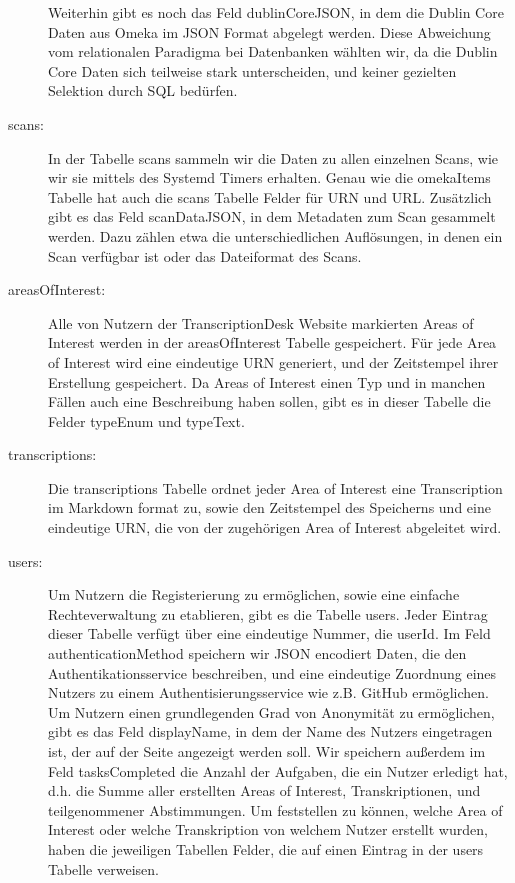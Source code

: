 \documentclass{article}
\begin{document}
\begin{description}
    Weiterhin gibt es noch das Feld dublinCoreJSON,
    in dem die Dublin Core Daten aus Omeka im JSON Format abgelegt werden.
    Diese Abweichung vom relationalen Paradigma bei Datenbanken wählten wir,
    da die Dublin Core Daten sich teilweise stark unterscheiden,
    und keiner gezielten Selektion durch SQL bedürfen.
\item[scans:]
    In der Tabelle scans sammeln wir die Daten zu allen einzelnen Scans,
    wie wir sie mittels des Systemd Timers erhalten.
    Genau wie die omekaItems Tabelle hat auch die scans Tabelle Felder für URN und URL.
    Zusätzlich gibt es das Feld scanDataJSON,
    in dem Metadaten zum Scan gesammelt werden.
    Dazu zählen etwa die unterschiedlichen Auflösungen,
    in denen ein Scan verfügbar ist
    oder das Dateiformat des Scans.
\item[areasOfInterest:]
    Alle von Nutzern der TranscriptionDesk Website markierten Areas of Interest werden in der areasOfInterest Tabelle gespeichert.
    Für jede Area of Interest wird eine eindeutige URN generiert,
    und der Zeitstempel ihrer Erstellung gespeichert.
    Da Areas of Interest einen Typ und in manchen Fällen auch eine Beschreibung haben sollen,
    gibt es in dieser Tabelle die Felder typeEnum und typeText.
\item[transcriptions:]
    Die transcriptions Tabelle ordnet jeder Area of Interest eine Transcription im Markdown format zu,
    sowie den Zeitstempel des Speicherns und eine eindeutige URN, die von der zugehörigen Area of Interest abgeleitet wird.
\item[users:]
    Um Nutzern die Registerierung zu ermöglichen,
    sowie eine einfache Rechteverwaltung zu etablieren,
    gibt es die Tabelle users.
    Jeder Eintrag dieser Tabelle verfügt über eine eindeutige Nummer, die userId.
    Im Feld authenticationMethod speichern wir JSON encodiert Daten,
    die den Authentikationsservice beschreiben,
    und eine eindeutige Zuordnung eines Nutzers zu einem Authentisierungsservice wie z.B. GitHub ermöglichen.
    Um Nutzern einen grundlegenden Grad von Anonymität zu ermöglichen,
    gibt es das Feld displayName,
    in dem der Name des Nutzers eingetragen ist,
    der auf der Seite angezeigt werden soll.
    Wir speichern außerdem im Feld tasksCompleted
    die Anzahl der Aufgaben, die ein Nutzer erledigt hat,
    d.h. die Summe aller erstellten Areas of Interest, Transkriptionen,
    und teilgenommener Abstimmungen.
    Um feststellen zu können, welche Area of Interest oder welche Transkription
    von welchem Nutzer erstellt wurden,
    haben die jeweiligen Tabellen Felder,
    die auf einen Eintrag in der users Tabelle verweisen.
\end{description}
\end{document}
